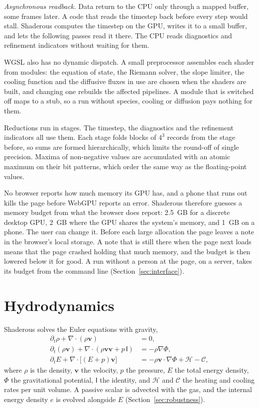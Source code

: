 \documentclass[twocolumn]{aastex701}
\begin{document}
\emph{Asynchronous readback.} Data return to the CPU only through a mapped buffer, some frames later. A code that reads the timestep back before every step would stall. Shaderous computes the timestep on the GPU, writes it to a small buffer, and lets the following passes read it there. The CPU reads diagnostics and refinement indicators without waiting for them.

WGSL also has no dynamic dispatch. A small preprocessor assembles each shader from modules: the equation of state, the Riemann solver, the slope limiter, the cooling function and the diffusive fluxes in use are chosen when the shaders are built, and changing one rebuilds the affected pipelines. A module that is switched off maps to a stub, so a run without species, cooling or diffusion pays nothing for them.

Reductions run in stages. The timestep, the diagnostics and the refinement indicators all use them. Each stage folds blocks of $4^3$ records from the stage before, so sums are formed hierarchically, which limits the round-off of single precision. Maxima of non-negative values are accumulated with an atomic maximum on their bit patterns, which order the same way as the floating-point values.

No browser reports how much memory its GPU has, and a phone that runs out kills the page before WebGPU reports an error. Shaderous therefore guesses a memory budget from what the browser does report: 2.5~GB for a discrete desktop GPU, 2~GB where the GPU shares the system's memory, and 1~GB on a phone. The user can change it. Before each large allocation the page leaves a note in the browser's local storage. A note that is still there when the page next loads means that the page crashed holding that much memory, and the budget is then lowered below it for good. A run without a person at the page, on a server, takes its budget from the command line (Section~\ref{sec:interface}).

\section{Hydrodynamics}
\label{sec:hydro}

Shaderous solves the Euler equations with gravity,
\begin{equation}
\begin{aligned}
\partial_t \rho + \nabla\cdot(\rho\mathbf{v}) &= 0,\\
\partial_t (\rho\mathbf{v}) + \nabla\cdot(\rho\mathbf{v}\mathbf{v} + p\,\mathsf{I}) &= -\rho\nabla\Phi,\\
\partial_t E + \nabla\cdot\bigl[(E + p)\mathbf{v}\bigr] &= -\rho\mathbf{v}\cdot\nabla\Phi + \mathcal{H} - \mathcal{C},
\end{aligned}
\label{eq:euler}
\end{equation}
where $\rho$ is the density, $\mathbf{v}$ the velocity, $p$ the pressure, $E$ the total energy density, $\Phi$ the gravitational potential, $\mathsf{I}$ the identity, and $\mathcal{H}$ and $\mathcal{C}$ the heating and cooling rates per unit volume. A passive scalar is advected with the gas, and the internal energy density $e$ is evolved alongside $E$ (Section~\ref{sec:robustness}).
\end{document}
